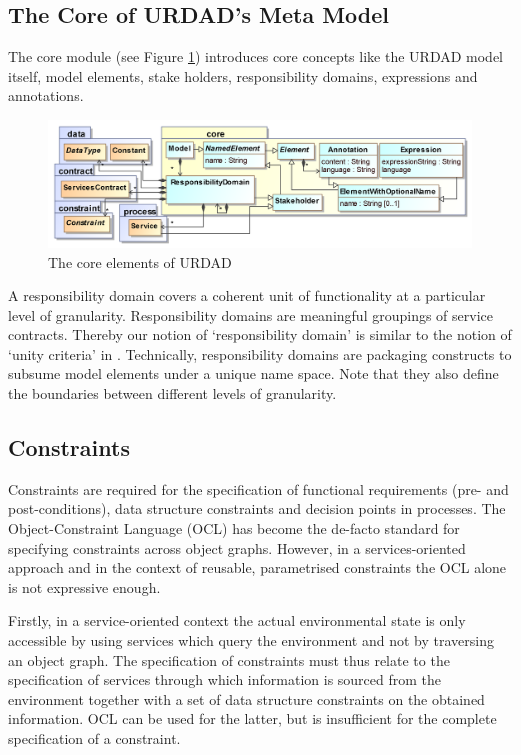 \subsection{The Core of URDAD's Meta Model}

The core module (see Figure \ref{fig:coreModule}) introduces core concepts like the URDAD model itself, model elements, stake holders, responsibility domains, expressions and annotations.
\begin{figure}[Htb]
  \centering
  \includegraphics{core}
  \caption{The core elements of URDAD}
  \label{fig:coreModule}
\end{figure}

A responsibility domain covers a coherent unit of functionality at a particular level of granularity. Responsibility domains are meaningful groupings of service contracts. Thereby our notion of `responsibility domain' is similar to the notion of `unity criteria' in \cite{gonzalez_unity_2009}. Technically, responsibility domains are packaging constructs to subsume model elements under a unique name space. Note that they also define the boundaries between different levels of granularity. 

\subsection{Constraints}

Constraints are required for the specification of functional requirements (pre- and post-conditions), data structure constraints and decision points in processes. The Object-Constraint Language (OCL) has become the de-facto standard for specifying constraints across object graphs. However, in a services-oriented approach and in the context of reusable, parametrised constraints the OCL alone is not expressive enough. 

Firstly, in a service-oriented context the actual environmental state is only accessible by using services which query the environment and not by traversing an object graph. The specification of constraints must thus relate to the specification of services through which information is sourced from the environment together with a set of data structure constraints on the obtained information. OCL can be used for the latter, but is insufficient for the complete specification of a constraint.

